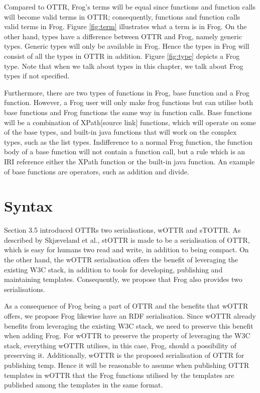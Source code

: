 \para
Compared to OTTR, Frog's terms will be equal since functions and function calls will become valid terms in OTTR; consequently, functions and function calls valid terms in Frog. Figure \ref{fig:term} illustrates what a term is in Frog. On the other hand, types have a difference between OTTR and Frog, namely generic types. Generic types will only be available in Frog. Hence the types in Frog will consist of all the types in OTTR in addition. Figure \ref{fig:type} depicts a Frog type. Note that when we talk about types in this chapter, we talk about Frog types if not specified.

\para
Furthermore, there are two types of functions in Frog, base function and a Frog function. However, a Frog user will only make frog functions but can utilise both base functions and Frog functions the same way in function calls. Base functions will be a combination of XPath[source link] functions, which will operate on some of the base types, and built-in java functions that will work on the complex types, such as the list types. Indifference to a normal Frog function, the function body of a base function will not contain a function call, but a rule which is an IRI reference either the XPath function or the built-in java function. An example of base functions are operators, such as addition and divide. 

\section{Syntax}
Section 3.5 introduced OTTRs two serialisations, wOTTR and sTOTTR. As described by Skjæveland et al., stOTTR is made to be a serialisation of OTTR, which is easy for humans two read and write, in addition to being compact\autocite[4]{SLKK_OTTR_2021}. On the other hand, the wOTTR serialisation offers the benefit of leveraging the existing W3C stack, in addition to tools for developing, publishing and maintaining templates\autocite[481-482]{SLKF_OTTR_2018}. Consequently, we propose that Frog also provides two serialisations.

\para
As a consequence of Frog being a part of OTTR and the benefits that wOTTR offers, we propose Frog likewise have an RDF serialisation. Since wOTTR already benefits from leveraging the existing W3C stack, we need to preserve this benefit when adding Frog. For wOTTR to preserve the property of leveraging the W3C stack, everything wOTTR utilises, in this case, Frog, should a possibility of preserving it.  Additionally, wOTTR is the proposed serialisation of OTTR for publishing temp. Hence it will be reasonable to assume when publishing OTTR templates in wOTTR that the Frog functions utilised by the templates are published among the templates in the same format.  

